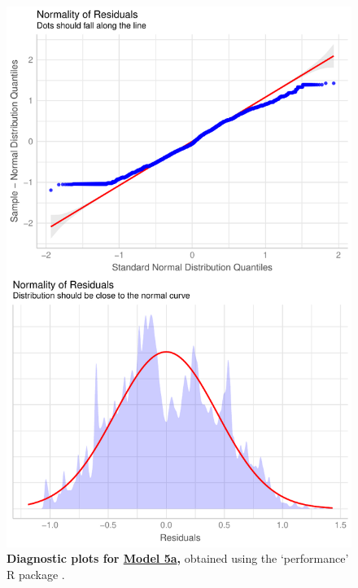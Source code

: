\begin{figure}[h!]
\centering
\includegraphics[scale=0.6]{Supporting/Chapter3/Figures/Diagnostics/Model5a_diag}
\caption[Diagnostic plots for Model 5a]{\textbf{Diagnostic plots for \underline{Model 5a},} obtained using the `performance' R package \citep{performance}.}
\label{}
\end{figure}


